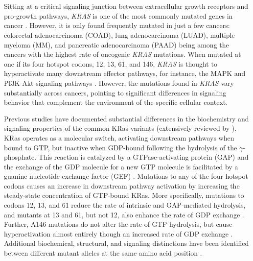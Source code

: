 \documentclass[english, 10pt, letterpaper]{article}
\newcommand{\KRAS}{\emph{KRAS}}
\newcommand{\kras}{KRas}
\begin{document}

\section*{}

Sitting at a critical signaling junction between extracellular growth receptors and pro-growth pathways, \KRAS{} is one of the most commonly mutated genes in cancer \cite{Barbacid1987, Bailey2018}.
However, it is only found frequently mutated in just a few cancers: colorectal adenocarcinoma (COAD), lung adenocarcinoma (LUAD), multiple myeloma (MM), and pancreatic adenocarcinoma (PAAD) being among the cancers with the highest rate of oncogenic \KRAS{} mutations.
When mutated at one if its four hotspot codons, 12, 13, 61, and 146, \KRAS{} is thought to hyperactivate many downstream effector pathways, for instance, the MAPK and PI3K-Akt signaling pathways \cite{Simanshu2017}.
However, the mutations found in \KRAS{} vary substantially across cancers, pointing to significant differences in signaling behavior that complement the environment of the specific cellular context.

Previous studies have documented substantial differences in the biochemistry and signaling properties of the common \kras{} variants (extensively reviewed by \cite{Miller2012, Li2018}).
\kras{} operates as a molecular switch, activating downstream pathways when bound to GTP, but inactive when GDP-bound following the hydrolysis of the $\gamma$-phosphate.
This reaction is catalyzed by a GTPase-activating protein (GAP) and the exchange of the GDP molecule for a new GTP molecule is facilitated by a guanine nucleotide exchange factor (GEF) \cite{Barbacid1987}.
Mutations to any of the four hotspot codons causes an increase in downstream pathway activation by increasing the steady-state concentration of GTP-bound \kras{}.
More specifically, mutations to codons 12, 13, and 61 reduce the rate of intrinsic and GAP-mediated hydrolysis, and mutants at 13 and 61, but not 12, also enhance the rate of GDP exchange \cite{Hunter2015a, Smith2013}.
Further, A146 mutations do not alter the rate of GTP hydrolysis, but cause hyperactivation almost entirely though an increased rate of GDP exchange \cite{Feig1988RelationshipProteins., Edkins2006, Janakiraman2010, Poulin2019}.
Additional biochemical, structural, and signaling distinctions have been identified between different mutant alleles at the same amino acid position \cite{Li2018, Hunter2015a, Poulin2019, Hobbs2019AtypicalCancer., Yu2018, Kovalski2019, Ihle2012, Spoerner2004, Smith2014a, Pantsar2018}.
\end{document}
